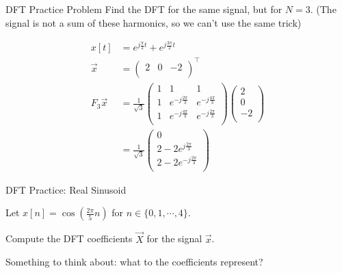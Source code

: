 \begin{frame}{DFT Practice Problem}
  Find the DFT for the same signal, but for $N=3$. (The signal is not a sum of these harmonics, so we can't use the same trick)

  \pause \begin{align*}
    x[t] &= e^{j\frac{\pi}{2}t} + e^{j\frac{3\pi}{2}t} \\
    \vec{x} &= \begin{pmatrix} 2 & 0 & -2 \\ \end{pmatrix}^{\intercal} \\
    F_3 \vec{x} &= \frac{1}{\sqrt{3}}
    \begin{pmatrix}
      1 & 1 & 1 \\
      1 & e^{-j\frac{2\pi}{3}} & e^{-j\frac{4\pi}{3}} \\
      1 & e^{-j\frac{4\pi}{3}} & e^{-j\frac{2\pi}{3}} \\
    \end{pmatrix}
    \begin{pmatrix}
      2 \\ 0 \\ -2 \\
    \end{pmatrix}
    \\
    &= \frac{1}{\sqrt{3}}
    \begin{pmatrix}
      0 \\
      2 - 2 e^{j\frac{2\pi}{3}} \\
      2 - 2 e^{-j\frac{2\pi}{3}} \\
    \end{pmatrix}
  \end{align*}
\end{frame}

\begin{frame}{DFT Practice: Real Sinusoid}

  Let $x[n] = \cos(\frac{2\pi}{5}n)$ for $n \in \{0,1,\cdots,4\}$.

  Compute the DFT coefficients $\vec{X}$ for the signal $\vec{x}$.

  Something to think about: what to the coefficients represent?

\end{frame}

